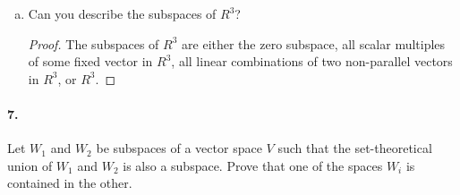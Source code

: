 \documentclass{article}
\begin{document}
\begin{enumerate}[(a)]
\begin{proof}
      Now suppose that there exists a $v_2 \in V, v_2 \neq 0$ such that $v_2
      \neq \alpha v_1$ for all $\alpha \in R$. Defining $v_1 = \begin{bmatrix}
        a \\
        b
      \end{bmatrix}$ and $v_2 = \begin{bmatrix}
        c \\
        d
      \end{bmatrix}$, we may construct a matrix $A = \begin{bmatrix}
        v_1 & v_2
      \end{bmatrix}
      = \begin{bmatrix}
        a & c \\
        b & d
      \end{bmatrix}$. Suppose $a \neq 0$ and let $r = c/a$; then, $ra = c$ and
      it follows that $rb \neq d$ since $v_2$ is not a scalar multiple of $v_1$.
      A similar argument holds for $a = 0$ and $b \neq 0$. Thus, $ad - bc \neq
      0$ and it follows from \textbf{Exercise 1.6.8} that $A$ is invertible.

      From \textbf{Theorem 1.13}, any vector $v \in R^2$ can be rewritten
      into $v = A\begin{bmatrix}
        e \\
        f
      \end{bmatrix} = ev_1 + fv_2$ for $e, f \in R$. Hence, $V = R^2$ if there
      exist two non-zero vectors $v_1, v_2 \in R^2$ which are not scalar
      multiples of each other.
    \end{proof}
  \item Can you describe the subspaces of $R^3$?

    \begin{proof}
      The subspaces of $R^3$ are either the zero subspace, all scalar multiples
      of some fixed vector in $R^3$, all linear combinations of two non-parallel
      vectors in $R^3$, or $R^3$.
    \end{proof}
\end{enumerate}

\paragraph{7.} Let $W_1$ and $W_2$ be subspaces of a vector space $V$ such that
the set-theoretical union of $W_1$ and $W_2$ is also a subspace. Prove that one
of the spaces $W_i$ is contained in the other.
\end{document}
